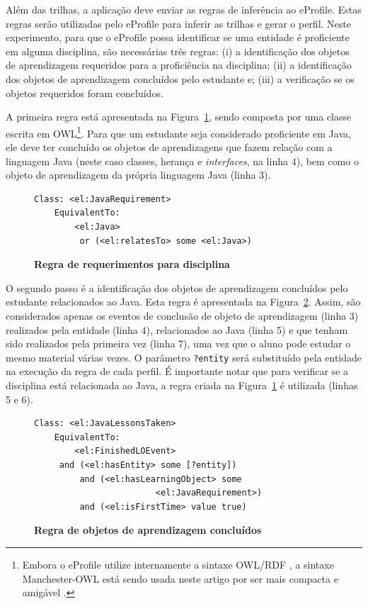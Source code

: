 \documentclass[times, 10pt, twocolumn]{article}
\begin{document}
Além das trilhas, a aplicação deve enviar as regras de inferência ao eProfile. Estas regras serão utilizadas pelo eProfile para inferir as trilhas e gerar o perfil. Neste experimento, para que o eProfile possa identificar se uma entidade é proficiente em alguma disciplina, são necessárias três regras: (i) a identificação dos objetos de aprendizagem requeridos para a proficiência na disciplina; (ii) a identificação dos objetos de aprendizagem concluídos pelo estudante e; (iii) a verificação se os objetos requeridos foram concluídos.

A primeira regra está apresentada na Figura~\ref{cod:regra1}, sendo composta por uma classe escrita em OWL\footnote{Embora o eProfile utilize internamente a sintaxe OWL/RDF \cite{owl-guide}, a sintaxe Manchester-OWL está sendo usada neste artigo por ser mais compacta e amigável \cite{owl-manchester}.}. Para que um estudante seja considerado proficiente em Java, ele deve ter concluído os objetos de aprendizagens que fazem relação com a linguagem Java (neste caso classes, herança e {\em interfaces}, na linha 4), bem como o objeto de aprendizagem da própria linguagem Java (linha 3). 

\begin{figure}
\begin{lstlisting}
Class: <el:JavaRequirement>
    EquivalentTo: 
        <el:Java>
         or (<el:relatesTo> some <el:Java>)
\end{lstlisting}
\caption{\textbf{Regra de requerimentos para disciplina}}
\label{cod:regra1}
\end{figure}

O segundo passo é a identificação dos objetos de aprendizagem concluídos pelo estudante relacionados ao Java. Esta regra é apresentada na Figura~\ref{cod:regra2}. Assim, são considerados apenas os eventos de conclusão de objeto de aprendizagem (linha 3) realizados pela entidade (linha 4), relacionados ao Java (linha 5) e que tenham sido realizados pela primeira vez (linha 7), uma vez que o aluno pode estudar o mesmo material várias vezes. O parâmetro \texttt{?entity} será substituído pela entidade na execução da regra de cada perfil. É importante notar que para verificar se a disciplina está relacionada ao Java, a regra criada na Figura~\ref{cod:regra1} é utilizada (linhas 5 e 6).

\begin{figure}
\begin{lstlisting}
Class: <el:JavaLessonsTaken>
    EquivalentTo: 
        <el:FinishedLOEvent>
	 and (<el:hasEntity> some [?entity])
         and (<el:hasLearningObject> some 
	                    <el:JavaRequirement>)
         and (<el:isFirstTime> value true)
\end{lstlisting}
\caption{\textbf{Regra de objetos de aprendizagem concluídos}}
\label{cod:regra2}
\end{figure}
\end{document}

